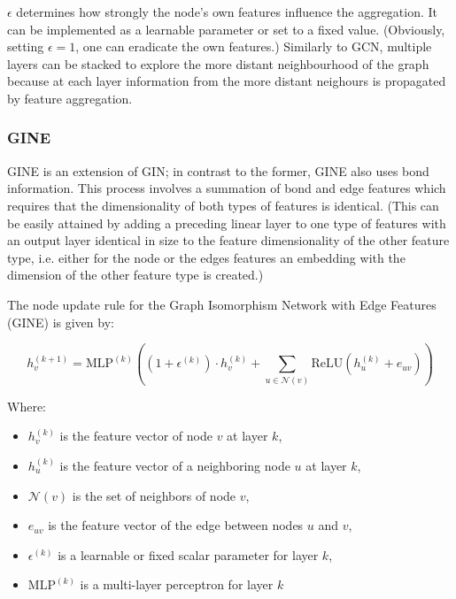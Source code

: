 \( \epsilon \) determines how strongly the node's own features influence the aggregation. It can be implemented as a learnable parameter or set to a fixed value. (Obviously, setting \( \epsilon = 1\), one can eradicate the own features.) 
Similarly to GCN, multiple layers can be stacked to explore the more distant neighbourhood of the graph because at each layer information from the more distant neighours is propagated by feature aggregation.



\subsubsection{GINE}

GINE is an extension of GIN; in contrast to the former, GINE also uses bond information\cite{Hu.29.05.2019}.
This process involves a summation of bond and edge features which requires that the dimensionality of both types of features is identical. (This can be easily attained by adding a preceding linear layer to one type of features with an output layer identical in size to the feature dimensionality of the other feature type, i.e. either for the node or the edges features an embedding with the dimension of the other feature type is created.)



The node update rule for the Graph Isomorphism Network with Edge Features (GINE) is given by:

\[
h_v^{(k+1)} = \text{MLP}^{(k)} \left( (1 + \epsilon^{(k)}) \cdot h_v^{(k)} + \sum_{u \in \mathcal{N}(v)} \text{ReLU} \left( h_u^{(k)} + e_{uv} \right) \right)
\]

Where:
\begin{itemize}
    \item \( h_v^{(k)} \) is the feature vector of node \( v \) at layer \( k \),
    \item \( h_u^{(k)} \) is the feature vector of a neighboring node \( u \) at layer \( k \),
    \item \( \mathcal{N}(v) \) is the set of neighbors of node \( v \),
    \item \( e_{uv} \) is the feature vector of the edge between nodes \( u \) and \( v \),
    \item \( \epsilon^{(k)} \) is a learnable or fixed scalar parameter for layer \( k \),
    \item \(\text{MLP}^{(k)}\) is a multi-layer perceptron for layer \( k \)
\end{itemize}


